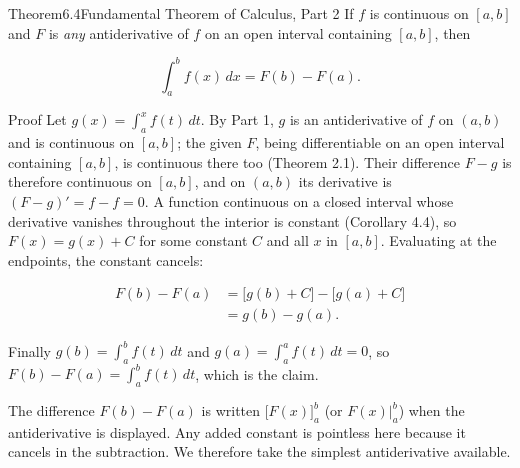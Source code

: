 \documentclass[a4paper,12pt,oneside]{memoir}
\begin{document}
\begin{envtheorem}{Theorem}{6.4}{Fundamental Theorem of Calculus, Part 2}
If \(f\) is continuous on \([a, b]\) and \(F\) is \emph{any} antiderivative of \(f\) on an open interval containing \([a, b]\), then

\[ \int_{a}^{b} f(x)\,dx = F(b) - F(a). \]
\end{envtheorem}
\begin{envproof}{Proof}{}{}
Let \(g(x) = \int_{a}^{x} f(t)\,dt\). By Part 1, \(g\) is an antiderivative of \(f\) on \((a, b)\) and is continuous on \([a, b]\); the given \(F\), being differentiable on an open interval containing \([a, b]\), is continuous there too (Theorem 2.1). Their difference \(F - g\) is therefore continuous on \([a, b]\), and on \((a, b)\) its derivative is \((F - g)' = f - f = 0\). A function continuous on a closed interval whose derivative vanishes throughout the interior is constant (Corollary 4.4), so \(F(x) = g(x) + C\) for some constant \(C\) and all \(x\) in \([a, b]\). Evaluating at the endpoints, the constant cancels:

\[ \begin{aligned}
        F(b) - F(a) &= \bigl[g(b) + C\bigr] - \bigl[g(a) + C\bigr] \\[2pt]
                    &= g(b) - g(a).
      \end{aligned} \]

Finally \(g(b) = \int_{a}^{b} f(t)\,dt\) and \(g(a) = \int_{a}^{a} f(t)\,dt = 0\), so \(F(b) - F(a) = \int_{a}^{b} f(t)\,dt\), which is the claim. \qedmark
\end{envproof}
The difference \(F(b) - F(a)\) is written \(\bigl[F(x)\bigr]_{a}^{b}\) (or \(F(x)\big|_{a}^{b}\)) when the antiderivative is displayed. Any added constant is pointless here because it cancels in the subtraction. We therefore take the simplest antiderivative available.
\end{document}
